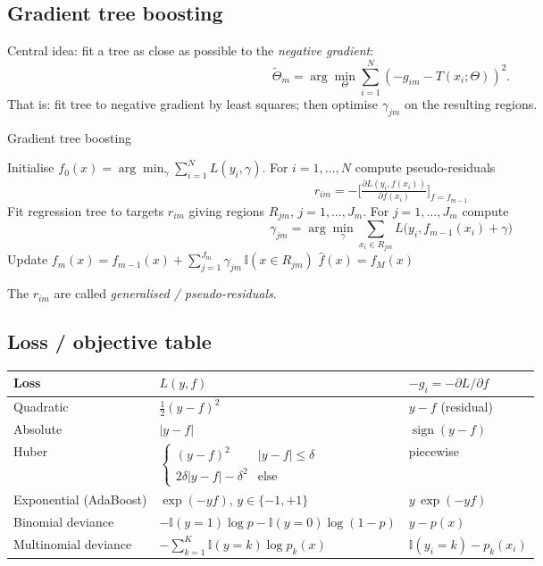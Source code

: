 \subsection{Gradient tree boosting}
Central idea: fit a tree as close as possible to the \emph{negative gradient}:
\[ \tilde\Theta_m = \arg\min_{\Theta} \sum_{i=1}^N (-g_{im} - T(x_i;\Theta))^2. \]
That is: fit tree to negative gradient by least squares; then optimise $\gamma_{jm}$ on the resulting regions.

\begin{algorithm}[H]
\caption{Gradient tree boosting}
\begin{algorithmic}
\State Initialise $f_0(x) = \arg\min_\gamma \sum_{i=1}^N L(y_i,\gamma)$.
  \State For $i=1,\dots,N$ compute pseudo-residuals
    \[ r_{im} = -\Big[\tfrac{\partial L(y_i,f(x_i))}{\partial f(x_i)}\Big]_{f=f_{m-1}} \]
  \State Fit regression tree to targets $r_{im}$ giving regions $R_{jm}$, $j=1,\dots,J_m$.
  \State For $j=1,\dots,J_m$ compute
    \[ \gamma_{jm} = \arg\min_\gamma \sum_{x_i\in R_{jm}} L\!\big(y_i, f_{m-1}(x_i) + \gamma\big) \]
  \State Update $f_m(x) = f_{m-1}(x) + \sum_{j=1}^{J_m} \gamma_{jm}\, \mathbb{I}(x\in R_{jm})$
\EndFor
\State \Return $\hat f(x) = f_M(x)$
\end{algorithmic}
\end{algorithm}
The $r_{im}$ are called \emph{generalised / pseudo-residuals}.

\subsection{Loss / objective table}
\scriptsize
\begin{tabularx}{\linewidth}{@{}l X l@{}}
\toprule
Loss & $L(y,f)$ & $-g_i = -\partial L/\partial f$ \\
\midrule
Quadratic & $\tfrac12 (y-f)^2$ & $y-f$ (residual) \\
Absolute & $|y-f|$ & $\operatorname{sign}(y-f)$ \\
Huber & $\begin{cases}(y-f)^2 & |y-f|\le \delta\\ 2\delta|y-f|-\delta^2 & \text{else}\end{cases}$ & piecewise \\
Exponential (AdaBoost) & $\exp(-y f)$, $y\in\{-1,+1\}$ & $y\,\exp(-y f)$ \\
Binomial deviance & $-\mathbb{I}(y{=}1)\log p - \mathbb{I}(y{=}0)\log(1-p)$ & $y - p(x)$ \\
Multinomial deviance & $-\sum_{k=1}^K \mathbb{I}(y{=}k)\log p_k(x)$ & $\mathbb{I}(y_i{=}k) - p_k(x_i)$ \\
\bottomrule
\end{tabularx}
\normalsize

